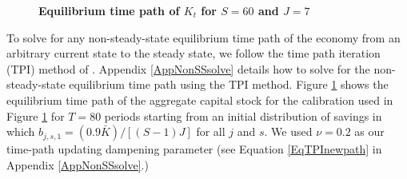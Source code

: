 \documentclass[letterpaper,12pt]{article}
\theoremstyle{definition}
\begin{document}
\begin{spacing}{1.5}
    \begin{figure}[htb]\centering \captionsetup{width=4.0in}
      \caption{\label{FigKpathTPI}\textbf{Equilibrium time path of $K_t$ for $S=60$ and $J=7$}}
    \end{figure}

    To solve for any non-steady-state equilibrium time path of the economy from an arbitrary current state to the steady state, we follow the time path iteration (TPI) method of \citet{AuerbachKotlikoff:1987}. Appendix \ref{AppNonSSsolve} details how to solve for the non-steady-state equilibrium time path using the TPI method. Figure \ref{FigKpathTPI} shows the equilibrium time path of the aggregate capital stock for the calibration used in Figure \ref{FigKpathTPI} for $T=80$ periods starting from an initial distribution of savings in which $b_{j,s,1}=(0.9\bar{K})/[(S-1)J]$ for all $j$ and $s$. We used $\nu=0.2$ as our time-path updating dampening parameter (see Equation \eqref{EqTPInewpath} in Appendix \ref{AppNonSSsolve}.)


\clearpage

\end{spacing}

\newpage
\renewcommand{\theequation}{A.\arabic{section}.\arabic{equation}}
\renewcommand{\thesection}{A-\arabic{section}}   %
\setcounter{equation}{0}                         %
\setcounter{section}{0}                          %
\end{document}
